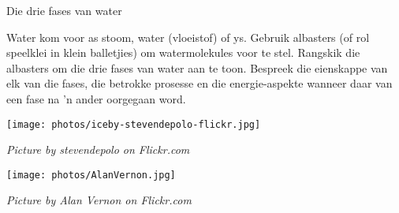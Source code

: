 \begin{activity}{Die drie fases van water}
\begin{minipage}{0.5\textwidth}
Water kom voor as stoom, water (vloeistof) of ys. Gebruik albasters (of rol speelklei in klein balletjies) om watermolekules voor te stel. Rangskik die albasters om die drie fases van water aan te toon. Bespreek die eienskappe van elk van die fases, die betrokke prosesse en die energie-aspekte wanneer daar van een fase na  'n ander oorgegaan word.
\end{minipage}
\begin{minipage}{.5\textwidth}
\begin{center}
 \texttt{[image: photos/iceby-stevendepolo-flickr.jpg]}\par
\textit{Picture by stevendepolo on Flickr.com}
\end{center}
\begin{center}
 \texttt{[image: photos/AlanVernon.jpg]}\par
\textit{Picture by Alan Vernon on Flickr.com}
\end{center}
\end{minipage}
\end{activity}

      
\label{m38730*cid7}

